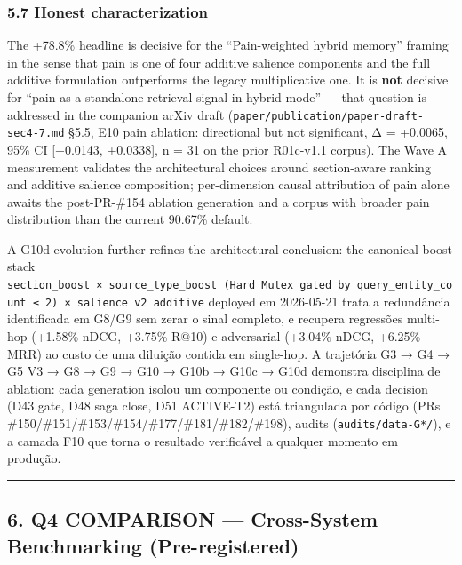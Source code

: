\documentclass[
]{article}
\begin{document}
\subsubsection{5.7 Honest
characterization}\label{honest-characterization}

The +78.8\% headline is decisive for the ``Pain-weighted hybrid memory''
framing in the sense that pain is one of four additive salience
components and the full additive formulation outperforms the legacy
multiplicative one. It is \textbf{not} decisive for ``pain as a
standalone retrieval signal in hybrid mode'' --- that question is
addressed in the companion arXiv draft
(\texttt{paper/publication/paper-draft-sec4-7.md} §5.5, E10 pain
ablation: directional but not significant, Δ = +0.0065, 95\% CI
{[}−0.0143, +0.0338{]}, n = 31 on the prior R01c-v1.1 corpus). The Wave
A measurement validates the architectural choices around section-aware
ranking and additive salience composition; per-dimension causal
attribution of pain alone awaits the post-PR-\#154 ablation generation
and a corpus with broader pain distribution than the current 90.67\%
default.

A G10d evolution further refines the architectural conclusion: the
canonical boost stack
\texttt{section\_boost\ ×\ source\_type\_boost\ (Hard\ Mutex\ gated\ by\ query\_entity\_count\ ≤\ 2)\ ×\ salience\ v2\ additive}
deployed em 2026-05-21 trata a redundância identificada em G8/G9 sem
zerar o sinal completo, e recupera regressões multi-hop (+1.58\% nDCG,
+3.75\% R@10) e adversarial (+3.04\% nDCG, +6.25\% MRR) ao custo de uma
diluição contida em single-hop. A trajetória G3 → G4 → G5 V3 → G8 → G9 →
G10 → G10b → G10c → G10d demonstra disciplina de ablation: cada
generation isolou um componente ou condição, e cada decision (D43 gate,
D48 saga close, D51 ACTIVE-T2) está triangulada por código (PRs
\#150/\#151/\#153/\#154/\#177/\#181/\#182/\#198), audits
(\texttt{audits/data-G*/}), e a camada F10 que torna o resultado
verificável a qualquer momento em produção.

\begin{center}\rule{0.5\linewidth}{0.5pt}\end{center}

\subsection{6. Q4 COMPARISON --- Cross-System Benchmarking
(Pre-registered)}\label{q4-comparison-cross-system-benchmarking-pre-registered}
\end{document}
